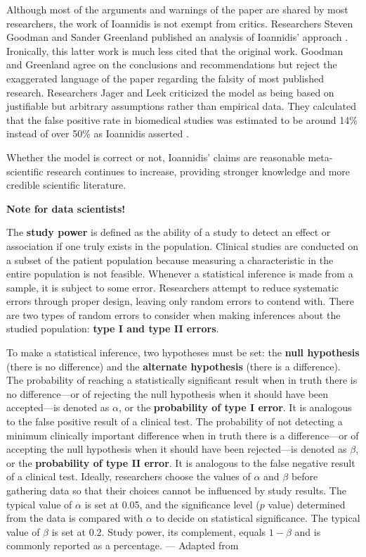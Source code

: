 \documentclass[
  12pt,
]{book}
\begin{document}
Although most of the arguments and warnings of the paper are shared by most researchers, the work of Ioannidis is not exempt from critics. Researchers Steven Goodman and Sander Greenland published an analysis of Ioannidis' approach \citep{goodman2007most}. Ironically, this latter work is much less cited that the original work. Goodman and Greenland agree on the conclusions and recommendations but reject the exaggerated language of the paper regarding the falsity of most published research. Researchers Jager and Leek criticized the model as being based on justifiable but arbitrary assumptions rather than empirical data. They calculated that the false positive rate in biomedical studies was estimated to be around 14\% instead of over 50\% as Ioannidis asserted \citep{jager2014estimate}.

Whether the model is correct or not, Ioannidis' claims are reasonable meta-scientific research continues to increase, providing stronger knowledge and more credible scientific literature.

\begin{tipbox}

\textbf{Note for data scientists!}

The \textbf{study power} is defined as the ability of a study to detect an effect or association if one truly exists in the population. Clinical studies are conducted on a subset of the patient population because measuring a characteristic in the entire population is not feasible. Whenever a statistical inference is made from a sample, it is subject to some error. Researchers attempt to reduce systematic errors through proper design, leaving only random errors to contend with. There are two types of random errors to consider when making inferences about the studied population: \textbf{type I and type II errors}.

To make a statistical inference, two hypotheses must be set: the \textbf{null hypothesis} (there is no difference) and the \textbf{alternate hypothesis} (there is a difference). The probability of reaching a statistically significant result when in truth there is no difference---or of rejecting the null hypothesis when it should have been accepted---is denoted as \(\alpha\), or the \textbf{probability of type I error}. It is analogous to the false positive result of a clinical test. The probability of not detecting a minimum clinically important difference when in truth there is a difference---or of accepting the null hypothesis when it should have been rejected---is denoted as \(\beta\), or the \textbf{probability of type II error}. It is analogous to the false negative result of a clinical test. Ideally, researchers choose the values of \(\alpha\) and \(\beta\) before gathering data so that their choices cannot be influenced by study results. The typical value of \(\alpha\) is set at 0.05, and the significance level (\(p\) value) determined from the data is compared with \(\alpha\) to decide on statistical significance. The typical value of \(\beta\) is set at 0.2. Study power, its complement, equals \(1-\beta\) and is commonly reported as a percentage. --- Adapted from \citep{cadeddu2008users}

\end{tipbox}
\end{document}
